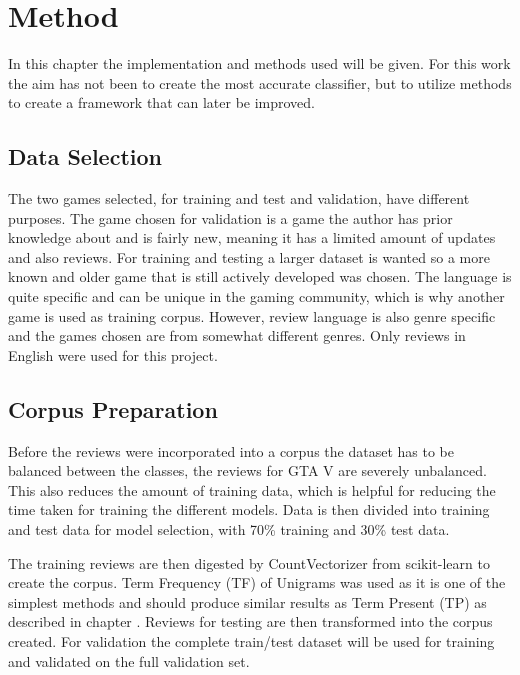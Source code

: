 \chapter{Method}
\label{cha:method}


In this chapter the implementation and methods used will be given. 
For this work the aim has not been to create the most accurate classifier, but to utilize methods to create a framework that can later be improved.


\section{Data Selection}
\label{sec:data-selection}


The two games selected, for training and test and validation, have different purposes. 
The game chosen for validation is a game the author has prior knowledge about and is fairly new, meaning it has a limited amount of updates and also reviews. 
For training and testing a larger dataset is wanted so a more known and older game that is still actively developed was chosen. 
The language is quite specific and can be unique in the gaming community, which is why another game is used as training corpus. 
However, review language is also genre specific and the games chosen are from somewhat different genres.
Only reviews in English were used for this project.


\section{Corpus Preparation}
\label{sec:corpus-preparation}


Before the reviews were incorporated into a corpus the dataset has to be balanced between the classes, the reviews for GTA V are severely unbalanced.
This also reduces the amount of training data, which is helpful for reducing the time taken for training the different models.
Data is then divided into training and test data for model selection, with 70\% training and 30\% test data.


The training reviews are then digested by CountVectorizer from scikit-learn to create the corpus. 
Term Frequency (TF) of Unigrams was used as it is one of the simplest methods and should produce similar results as Term Present (TP) as described in chapter . 
Reviews for testing are then transformed into the corpus created. 
For validation the complete train/test dataset will be used for training and validated on the full validation set.



